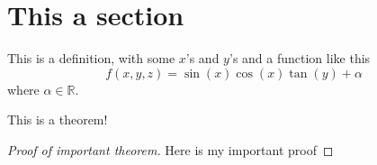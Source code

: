 \documentclass[12pt]{article}
\begin{document}

\tableofcontents
\pagebreak

\section{This a section}
	\begin{defn}
		This is a definition, with some $x$'s and $y$'s and a function like this
		\[
			f(x,y,z) = \sin(x)\cos(x)\tan(y) + \alpha
		\]
		where $\alpha \in \mathbb{R}$.
	\end{defn}
	
	\begin{thm}
		This is a theorem!
	\end{thm}
	\begin{proof}[Proof of important theorem]
		Here is my important proof
	\end{proof}
\end{document}
